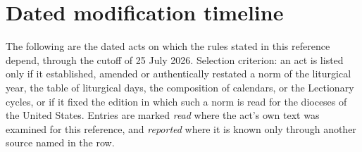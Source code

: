\section{Dated modification timeline}
\label{sec:timeline}

The following are the dated acts on which the rules stated in this reference depend, through the
cutoff of 25 July 2026. Selection criterion: an act is listed only if it established, amended or
authentically restated a norm of the liturgical year, the table of liturgical days, the composition
of calendars, or the Lectionary cycles, or if it fixed the edition in which such a norm is read for
the dioceses of the United States. Entries are marked \emph{read} where the act's own text was
examined for this reference, and \emph{reported} where it is known only through another source named
in the row.

